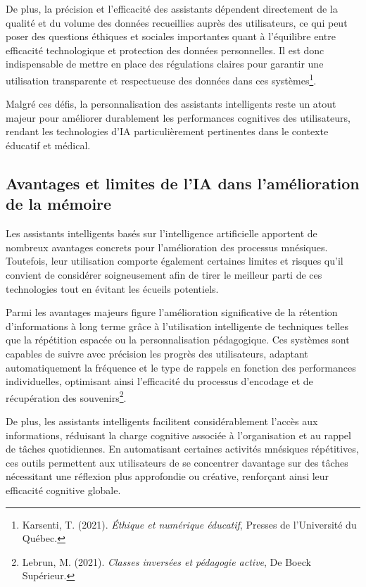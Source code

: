 \documentclass[12pt,a4paper]{report}
\begin{document}
De plus, la précision et l’efficacité des assistants dépendent directement de la qualité et du volume des données recueillies auprès des utilisateurs, ce qui peut poser des questions éthiques et sociales importantes quant à l'équilibre entre efficacité technologique et protection des données personnelles. Il est donc indispensable de mettre en place des régulations claires pour garantir une utilisation transparente et respectueuse des données dans ces systèmes\footnote{Karsenti, T. (2021). \textit{Éthique et numérique éducatif}, Presses de l’Université du Québec.}.

Malgré ces défis, la personnalisation des assistants intelligents reste un atout majeur pour améliorer durablement les performances cognitives des utilisateurs, rendant les technologies d'IA particulièrement pertinentes dans le contexte éducatif et médical.

\subsection{Avantages et limites de l’IA dans l’amélioration de la mémoire}

Les assistants intelligents basés sur l’intelligence artificielle apportent de nombreux avantages concrets pour l'amélioration des processus mnésiques. Toutefois, leur utilisation comporte également certaines limites et risques qu’il convient de considérer soigneusement afin de tirer le meilleur parti de ces technologies tout en évitant les écueils potentiels.

Parmi les avantages majeurs figure l’amélioration significative de la rétention d’informations à long terme grâce à l'utilisation intelligente de techniques telles que la répétition espacée ou la personnalisation pédagogique. Ces systèmes sont capables de suivre avec précision les progrès des utilisateurs, adaptant automatiquement la fréquence et le type de rappels en fonction des performances individuelles, optimisant ainsi l’efficacité du processus d’encodage et de récupération des souvenirs\footnote{Lebrun, M. (2021). \textit{Classes inversées et pédagogie active}, De Boeck Supérieur.}.

De plus, les assistants intelligents facilitent considérablement l’accès aux informations, réduisant la charge cognitive associée à l’organisation et au rappel de tâches quotidiennes. En automatisant certaines activités mnésiques répétitives, ces outils permettent aux utilisateurs de se concentrer davantage sur des tâches nécessitant une réflexion plus approfondie ou créative, renforçant ainsi leur efficacité cognitive globale.
\end{document}
